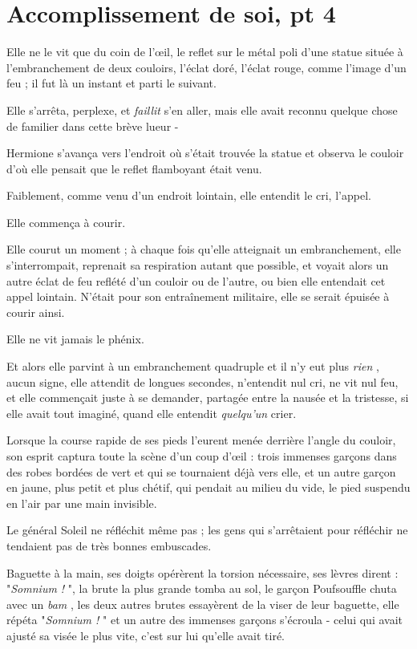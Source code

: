 
\chapter{Accomplissement de soi, pt 4}

Elle ne le vit que du coin de l'œil, le reflet sur le métal poli d'une statue située à l'embranchement de deux couloirs, l'éclat doré, l'éclat rouge, comme l'image d'un feu ; il fut là un instant et parti le suivant.

Elle s'arrêta, perplexe, et \emph{faillit}  s'en aller, mais elle avait reconnu quelque chose de familier dans cette brève lueur -

Hermione s'avança vers l'endroit où s'était trouvée la statue et observa le couloir d'où elle pensait que le reflet flamboyant était venu.

Faiblement, comme venu d'un endroit lointain, elle entendit le cri, l'appel.

Elle commença à courir.

Elle courut un moment ; à chaque fois qu'elle atteignait un embranchement, elle s'interrompait, reprenait sa respiration autant que possible, et voyait alors un autre éclat de feu reflété d'un couloir ou de l'autre, ou bien elle entendait cet appel lointain. N'était pour son entraînement militaire, elle se serait épuisée à courir ainsi.

Elle ne vit jamais le phénix.

Et alors elle parvint à un embranchement quadruple et il n'y eut plus \emph{rien} , aucun signe, elle attendit de longues secondes, n'entendit nul cri, ne vit nul feu, et elle commençait juste à se demander, partagée entre la nausée et la tristesse, si elle avait tout imaginé, quand elle entendit \emph{quelqu'un}  crier.

Lorsque la course rapide de ses pieds l'eurent menée derrière l'angle du couloir, son esprit captura toute la scène d'un coup d'œil : trois immenses garçons dans des robes bordées de vert et qui se tournaient déjà vers elle, et un autre garçon en jaune, plus petit et plus chétif, qui pendait au milieu du vide, le pied suspendu en l'air par une main invisible.

Le général Soleil ne réfléchit même pas ; les gens qui s'arrêtaient pour réfléchir ne tendaient pas de très bonnes embuscades.

Baguette à la main, ses doigts opérèrent la torsion nécessaire, ses lèvres dirent : "\emph{Somnium !} ", la brute la plus grande tomba au sol, le garçon Poufsouffle chuta avec un \emph{bam} , les deux autres brutes essayèrent de la viser de leur baguette, elle répéta "\emph{Somnium !} " et un autre des immenses garçons s'écroula - celui qui avait ajusté sa visée le plus vite, c'est sur lui qu'elle avait tiré.

